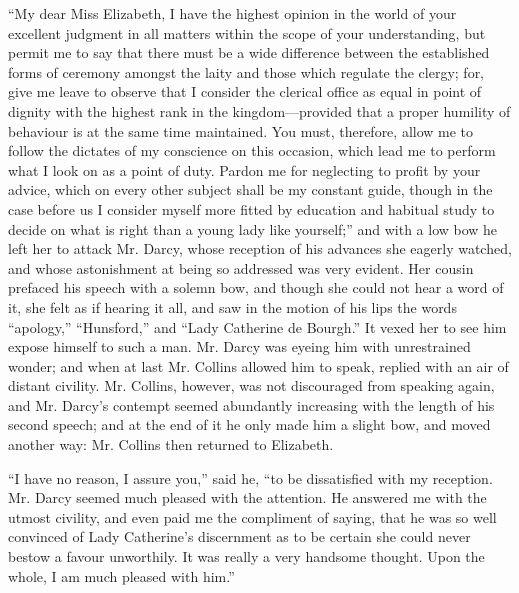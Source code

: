 \documentclass[12pt]{book}
\begin{document}
``My dear Miss Elizabeth, I have the highest opinion in the world of your excellent judgment in all matters within the scope of your understanding, but permit me to say that there must be a wide difference between the established forms of ceremony amongst the laity and those which regulate the clergy; for, give me leave to observe that I consider the clerical office as equal in point of dignity with the highest rank in the kingdom---provided that a proper humility of behaviour is at the same time maintained. You must, therefore, allow me to follow the dictates of my conscience on this occasion, which lead me to perform what I look on as a point of duty. Pardon me for neglecting to profit by your advice, which on every other subject shall be my constant guide, though in the case before us I consider myself more fitted by education and habitual study to decide on what is right than a young lady like yourself;'' and with a low bow he left her to attack Mr. Darcy, whose reception of his advances she eagerly watched, and whose astonishment at being so addressed was very evident. Her cousin prefaced his speech with a solemn bow, and though she could not hear a word of it, she felt as if hearing it all, and saw in the motion of his lips the words ``apology,'' ``Hunsford,'' and ``Lady Catherine de Bourgh.'' It vexed her to see him expose himself to such a man. Mr. Darcy was eyeing him with unrestrained wonder; and when at last Mr. Collins allowed him to speak, replied with an air of distant civility. Mr. Collins, however, was not discouraged from speaking again, and Mr. Darcy's contempt seemed abundantly increasing with the length of his second speech; and at the end of it he only made him a slight bow, and moved another way: Mr. Collins then returned to Elizabeth.

``I have no reason, I assure you,'' said he, ``to be dissatisfied with my reception. Mr. Darcy seemed much pleased with the attention. He answered me with the utmost civility, and even paid me the compliment of saying, that he was so well convinced of Lady Catherine's discernment as to be certain she could never bestow a favour unworthily. It was really a very handsome thought. Upon the whole, I am much pleased with him.''
\end{document}

